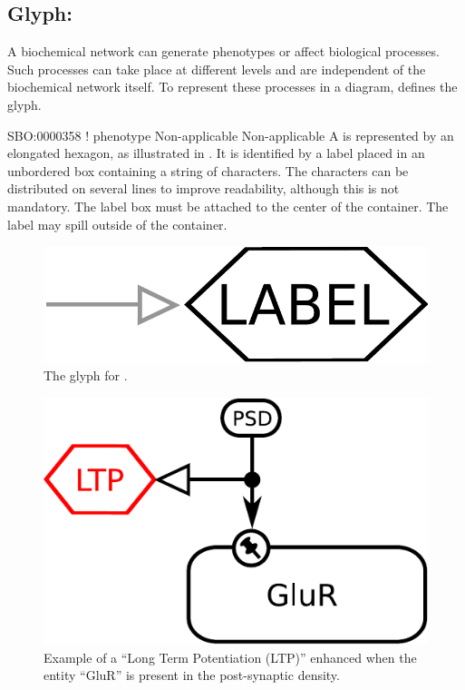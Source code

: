 

\subsection{Glyph: }
\label{sec:phenotype}

A biochemical network can generate phenotypes or affect biological
processes.  Such processes can take place at different levels and are
independent of the biochemical network itself.  To represent these
processes in a diagram, \SBGNERLone defines the  glyph.

\begin{glyphDescription}

\glyphSboTerm SBO:0000358 ! phenotype
\glyphOrigin Non-applicable
\glyphTarget Non-applicable
\glyphEndPoint A  is represented by an elongated
hexagon, as illustrated in . It is identified by a label placed in an
unbordered box containing a string of characters.  The characters can be
distributed on several lines to improve readability, although this is not
mandatory.  The label box must be attached to the center of the
 container.  The label may spill outside of the container.

\end{glyphDescription}
 
\begin{figure}[H]
  \centering
  \includegraphics[scale = 0.3]{images/phenotype}
  \caption{The \ER glyph for .}
  \label{fig:phenotype}
\end{figure}

\begin{figure}[H]
  \centering
  \includegraphics[scale = 0.5]{examples/ex-phenotype}
  \caption{Example of a  ``Long Term Potentiation (LTP)'' enhanced when the entity ``GluR'' is present in the post-synaptic density.}
  \label{fig:ex-phenotype}
\end{figure}


